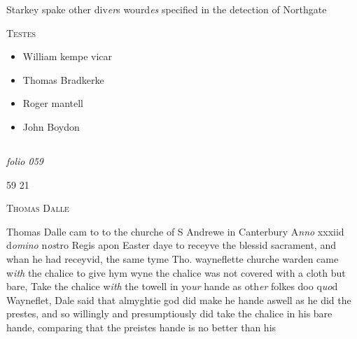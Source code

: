 \documentclass[12pt, a4paper]{book}
\begin{document}
		\ifthenelse{\isodd{\thepage}}
		{\reversemarginpar}
		{\normalmarginpar}
		Starkey spake other div\textit{er}s wourd\textit{es} specified in the
 detection of Northgate
\begin{center} {\scshape Testes} \end{center}\begin{itemize}
	
 \item[]William kempe vicar
	\item[]Thomas Bradkerke
	\item[]Roger mantell
	\item[]John Boydon\end{itemize}


               

\dotfill
						\newpage {} \subsection*{}

\textit{folio 059}


\begin{flushright}{\color{Mahogany}59} 21\end{flushright}
 

	
				\begin{center}  {\scshape Thomas Dalle}  \end{center}
			
	
		
				\marginpar[\vspace{0.5cm}{\textcolor{Gray}{offensive}}]{}
			
		
		\ifthenelse{\isodd{\thepage}}
		{\reversemarginpar}
		{\normalmarginpar}
		Thomas Dalle cam to to the churche of S Andrewe
			in Canterbury A\textit{nno} xxxiid d\textit{omino} n\textit{os}tro Regis apon Easter
 daye to receyve the blessid sacrament, and whan
			he had receyvid, the same tyme Tho. wayneflette
  	churche warden came w\textit{ith} the chalice to give hym wyne
 the chalice was not covered with a cloth but bare, Take
 the chalice w\textit{ith} the towell in yo\textit{ur} hande as oth\textit{er} folkes doo
			q\textit{uo}d Wayneflet, Dale said that almyghtie god did make
 he hande aswell as he did the prestes, and so willingly
 and presumptiously did take the chalice in his bare
 hande, comparing that the preistes hande is no better
		 than his
	
\end{document}
